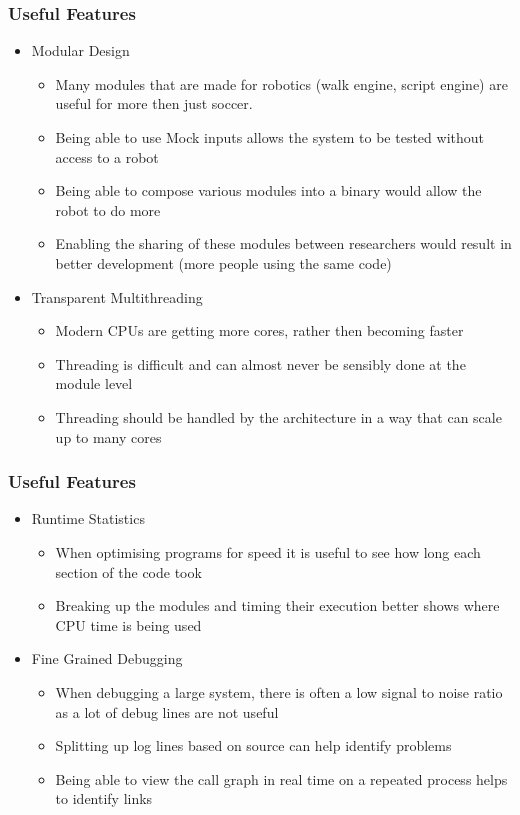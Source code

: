 \documentclass{beamer}
\begin{document}
\begin{frame}
	\frametitle{Useful Features}
	\begin{itemize}
		\item Modular Design
			\begin{itemize}
				\item Many modules that are made for robotics (walk engine, script engine) are useful for more then just soccer.
				\item Being able to use Mock inputs allows the system to be tested without access to a robot
				\item Being able to compose various modules into a binary would allow the robot to do more
				\item Enabling the sharing of these modules between researchers would result in better development (more people using the same code)
			\end{itemize}
			
		\item Transparent Multithreading
			\begin{itemize}
				\item Modern CPUs are getting more cores, rather then becoming faster
				\item Threading is difficult and can almost never be sensibly done at the module level
				\item Threading should be handled by the architecture in a way that can scale up to many cores
			\end{itemize}
	\end{itemize}
\end{frame}
			
\begin{frame}
	\frametitle{Useful Features}
	\begin{itemize}
		\item Runtime Statistics
			\begin{itemize}
				\item When optimising programs for speed it is useful to see how long each section of the code took
				\item Breaking up the modules and timing their execution better shows where CPU time is being used
			\end{itemize}
			
		\item Fine Grained Debugging
			\begin{itemize}
				\item When debugging a large system, there is often a low signal to noise ratio as a lot of debug lines are not useful
				\item Splitting up log lines based on source can help identify problems
				\item Being able to view the call graph in real time on a repeated process helps to identify links
			\end{itemize}
	\end{itemize}
\end{frame}
\end{document}
